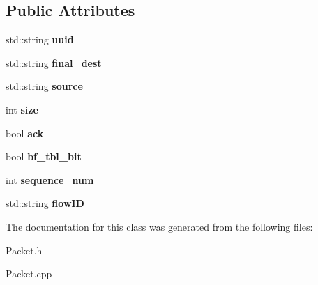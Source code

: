 \subsection*{\-Public \-Attributes}
\begin{DoxyCompactItemize}
\item 
\hypertarget{classPacket_acaefdb9f910265a1ff97b522a780f088}{std\-::string {\bfseries uuid}}\label{classPacket_acaefdb9f910265a1ff97b522a780f088}

\item 
\hypertarget{classPacket_a14d18bd9829ec1951730bc8bbadb570d}{std\-::string {\bfseries final\-\_\-dest}}\label{classPacket_a14d18bd9829ec1951730bc8bbadb570d}

\item 
\hypertarget{classPacket_a9fdc30310ed4a548f4a51dc6c79442d9}{std\-::string {\bfseries source}}\label{classPacket_a9fdc30310ed4a548f4a51dc6c79442d9}

\item 
\hypertarget{classPacket_ad6c10fc808850949cd3f9b9a2ff018d5}{int {\bfseries size}}\label{classPacket_ad6c10fc808850949cd3f9b9a2ff018d5}

\item 
\hypertarget{classPacket_a1824b08ed28de1f329146d082b6d0dee}{bool {\bfseries ack}}\label{classPacket_a1824b08ed28de1f329146d082b6d0dee}

\item 
\hypertarget{classPacket_ab3bb221061fb274a23f041e4b5e93ce7}{bool {\bfseries bf\-\_\-tbl\-\_\-bit}}\label{classPacket_ab3bb221061fb274a23f041e4b5e93ce7}

\item 
\hypertarget{classPacket_a1dcc152b6caa339c9d6f86c0fcde1c52}{int {\bfseries sequence\-\_\-num}}\label{classPacket_a1dcc152b6caa339c9d6f86c0fcde1c52}

\item 
\hypertarget{classPacket_ad841c025e14798586e5a01dfb17a8e56}{std\-::string {\bfseries flow\-I\-D}}\label{classPacket_ad841c025e14798586e5a01dfb17a8e56}

\end{DoxyCompactItemize}


\-The documentation for this class was generated from the following files\-:\begin{DoxyCompactItemize}
\item 
\-Packet.\-h\item 
\-Packet.\-cpp\end{DoxyCompactItemize}
